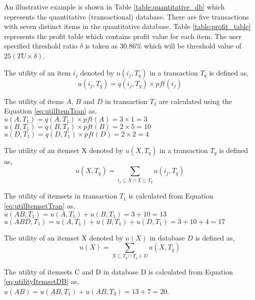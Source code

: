 \documentclass[11pt,openright]{report}
\begin{document}
An illustrative example is shown in Table \ref{table:quantitative_db} which represents the quantitative (transactional) database. There are five transactions with seven distinct items in the quantitative database. Table \ref{table:profit_table} represents the profit table which contains profit value for each item. The user specified threshold ratio $\delta$ is taken as $30.86\%$ which will be threshold value of $25 (TU \times \delta)$.


\begin{definition}
	The utility of an item $i_j$ denoted by $u(i_j, T_q)$ in a transaction $T_q$ is defined as,
	\begin{equation}
	u(i_j, T_q) = q(i_j, T_q) \times pft(i_j)    \label{eq:utilItemTran}
	\end{equation}
\end{definition}
The utility of items $A$, $B$ and $D$ in transaction $T_1$ are calculated using the Equation \ref{eq:utilItemTran} as,\\
\indent $u(A,T_1) = q(A,T_1) \times pft(A) = 3 \times 1 = 3$\\
\indent $u(B,T_1) = q(B,T_1) \times pft(B) = 2 \times 5 = 10$\\
\indent $u(D,T_1) = q(D,T_1) \times pft(D) = 2 \times 2 = 4$

\begin{definition}
	The utility of an itemset X denoted by $u(X, T_q)$ in a transaction $T_q$ is defined as,
	\begin{equation}
	u(X, T_q) = \sum_{i_j \subseteq X \cap X \subseteq T_q} u(i_j, T_q) \label{eq:utilItemsetTran}
	\end{equation}
\end{definition}
 The utility of itemsets in transaction $T_1$ is calculated from Equation \ref{eq:utilItemsetTran} as,\\ 
\indent $u(AB,T_1) = u(A,T_1) + u(B,T_1) = 3 + 10 = 13$ \\
\indent $u(ABD,T_1) = u(A,T_1) + u(B,T_1) + u(D,T_1) = 3 + 10 + 4= 17$ 

\begin{definition}
	The utility of an itemset X denoted by $u(X)$ in database $D$ is defined as,
	\begin{equation}
	u(X) = \sum_{X \subseteq T_q \cap T_q \in D} u(X, T_q) \label{eq:utilityItemsetDB}
	\end{equation}
\end{definition}
The utility of itemsets C and D in database D is calculated from Equation \ref{eq:utilityItemsetDB} as, \\
\indent $u(AB) = u(AB,T_1) + u(AB,T_3) = 13 + 7 = 20$.
\end{document}
